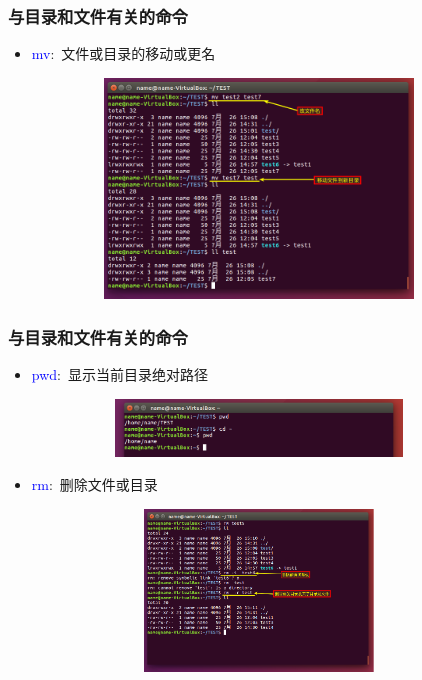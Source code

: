 \frame
{
	\frametitle{与目录和文件有关的命令}
	\begin{itemize}
		\item \textcolor{blue}{mv}:~文件或目录的移动或更名
\begin{figure}[h!]
\centering
\vspace{-12.5pt}
\includegraphics[height=2.3in,width=3.9in,viewport=0 0 800 550,clip]{Figures/Ubuntu-mv.png}
\label{Linux-command-mv}
\end{figure}
	\end{itemize}
}

\frame
{
	\frametitle{与目录和文件有关的命令}
	\begin{itemize}
\setlength{\itemsep}{-10pt}
		\item \textcolor{blue}{pwd}:~显示当前目录绝对路径
\begin{figure}[h!]
\centering
\vspace{-15.5pt}
\includegraphics[height=0.6in,width=3.9in,viewport=0 0 800 160,clip]{Figures/Ubuntu-pwd.png}
\label{Linux-command-pwd}
\end{figure}
		\item \textcolor{blue}{rm}:~删除文件或目录
\begin{figure}[h!]
\centering
\vspace{-15.5pt}
\includegraphics[height=1.7in,width=3.9in,viewport=0 120 800 550,clip]{Figures/Ubuntu-rm.png}
\label{Linux-command-rm}
\end{figure}
\end{itemize}
}

